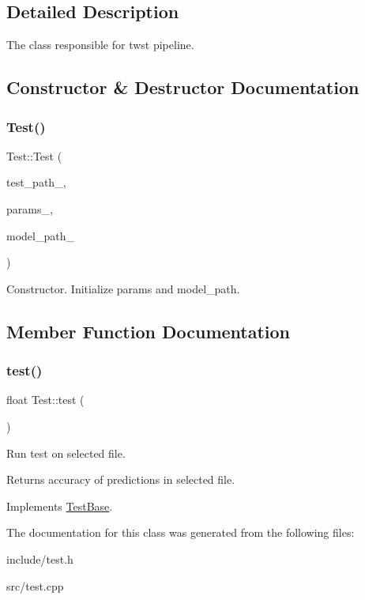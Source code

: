 \subsection{Detailed Description}
The class responsible for twst pipeline. 

\subsection{Constructor \& Destructor Documentation}
\mbox{\label{classTest_a6eeaef1054e710158c2d48a6c3497a23}} 
\subsubsection{\texorpdfstring{Test()}{Test()}}
{\footnotesize\ttfamily Test\+::\+Test (\begin{DoxyParamCaption}\item[{string}]{test\+\_\+path\+\_\+,  }\item[{const \hyperlink{structTrainParameters}{Train\+Parameters} \&}]{params\+\_\+,  }\item[{string}]{model\+\_\+path\+\_\+ }\end{DoxyParamCaption})\hspace{0.3cm}{\ttfamily [explicit]}}

Constructor. Initialize params and model\+\_\+path. 

\subsection{Member Function Documentation}
\mbox{\label{classTest_ae984138ce2da7b201d3fa97a4b775fb3}} 
\subsubsection{\texorpdfstring{test()}{test()}}
{\footnotesize\ttfamily float Test\+::test (\begin{DoxyParamCaption}{ }\end{DoxyParamCaption})\hspace{0.3cm}{\ttfamily [virtual]}}

Run test on selected file. \begin{DoxyReturn}{Returns}
accuracy of predictions in selected file. 
\end{DoxyReturn}


Implements \hyperlink{classTestBase}{Test\+Base}.



The documentation for this class was generated from the following files\+:\begin{DoxyCompactItemize}
\item 
include/test.\+h\item 
src/test.\+cpp\end{DoxyCompactItemize}
